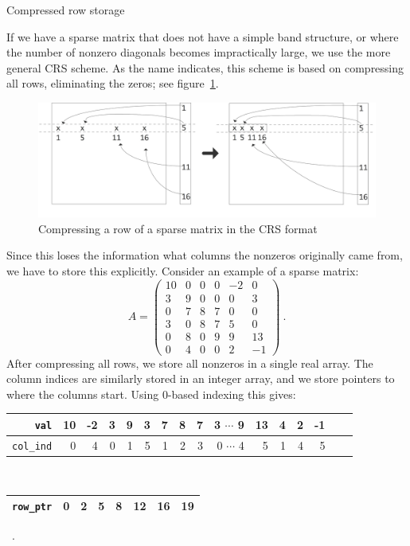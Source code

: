 
 {Compressed row storage}
\label{sec:crs}

If we have a sparse matrix that does not have a simple band structure,
or where the number of nonzero diagonals becomes impractically large,
we use the more general \acf{CRS} scheme. As the name indicates, this
scheme is based on compressing all rows, eliminating the zeros; see
figure~\ref{fig:crs}.
\begin{figure}[ht]
  \includegraphics[scale=.13]{graphics/crs}
  \caption{Compressing a row of a sparse matrix in the CRS format}
  \label{fig:crs}
\end{figure}
Since this loses the information what columns the nonzeros originally
came from, we have to store this explicitly.
Consider an example of a sparse matrix:
\begin{equation}
A =
\left(\begin{array}{rrrrrr}
      10 &  0 &  0 & 0  &-2 &  0 \\
       3 &  9 &  0 & 0  & 0 &  3 \\
       0 &  7 &  8 & 7  & 0 &  0 \\
       3 &  0 &  8 & 7  & 5 &  0 \\
       0 &  8 &  0 & 9  & 9 & 13 \\
       0 &  4 &  0 & 0  & 2 & -1
           \end{array}
\right) ~.
\end{equation}
After compressing all rows, we store all
nonzeros in a single real array. The column indices are
similarly stored in an integer array, and we store pointers to where
the columns start. Using 0-based indexing this gives:
\begin{center}
\begin{tabular}{|r|r|r|r|r|r|r|r|r|r|r|r|r|r|r|r|} \hline
{\tt val}     &10 &-2& 3& 9& 3& 7& 8& 7& 3 $\cdots$  9&13& 4& 2&-1 \\ \hline
{\tt col\_ind}& 0 & 4& 0& 1& 5& 1& 2& 3& 0 $\cdots$  4& 5& 1& 4& 5 \\ \hline
\end{tabular} \\
\vspace{.02 in}
\begin{tabular}{|r|r|r|r|r|r|r|r|} \hline
{\tt row\_ptr}& 0 & 2 & 5 & 8 & 12 & 16 & 19  \\ \hline
\end{tabular} ~.
\end{center}
